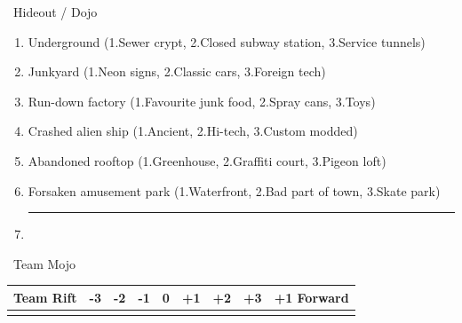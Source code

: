 \Large{}~Hideout / Dojo
\normalfont\large
\vspace{-6pt}
\begin{enumerate}
    \setlength\itemsep{-0.3em}
    \item Underground (1.Sewer crypt, 2.Closed subway station, 3.Service tunnels)
    \item Junkyard (1.Neon signs, 2.Classic cars, 3.Foreign tech)
    \item Run-down factory (1.Favourite junk food, 2.Spray cans, 3.Toys)
    \item Crashed alien ship (1.Ancient, 2.Hi-tech, 3.Custom modded)
    \item Abandoned rooftop (1.Greenhouse, 2.Graffiti court, 3.Pigeon loft)
    \item Forsaken amusement park (1.Waterfront, 2.Bad part of town, 3.Skate park)
    \item[] \rule{0.6\linewidth}{1pt}\\
\end{enumerate}

\vspace{0.5cm}

\Large{}~Team Mojo \hspace{0.5cm}
\normalfont\large
\begin{tabular}{|r|c|c|c|c|c|c|c|c|}
    \hline
    Team Rift & -3 & -2 & -1 & 0 & +1 & +2 & +3 & +1 Forward \\
    \hline
    &&&&&&&&\\
    \hline
\end{tabular}
\hspace{0.5cm}\Large\faPizzaSlice
\newpage